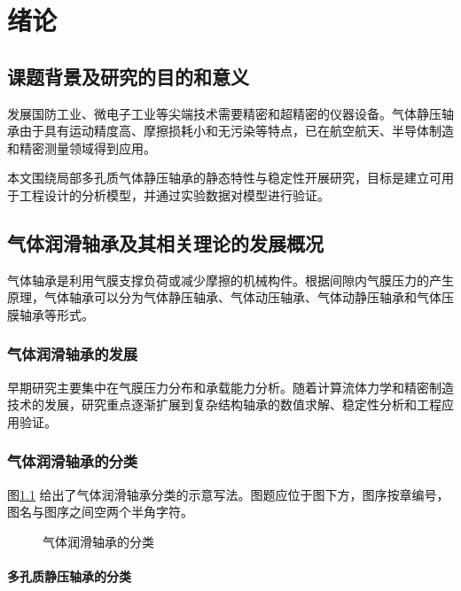 
\chapter{绪论}

\section{课题背景及研究的目的和意义}

发展国防工业、微电子工业等尖端技术需要精密和超精密的仪器设备。气体静压轴承由于具有运动精度高、摩擦损耗小和无污染等特点，已在航空航天、半导体制造和精密测量领域得到应用。

本文围绕局部多孔质气体静压轴承的静态特性与稳定性开展研究，目标是建立可用于工程设计的分析模型，并通过实验数据对模型进行验证。

\section{气体润滑轴承及其相关理论的发展概况}

气体轴承是利用气膜支撑负荷或减少摩擦的机械构件。根据间隙内气膜压力的产生原理，气体轴承可以分为气体静压轴承、气体动压轴承、气体动静压轴承和气体压膜轴承等形式。

\subsection{气体润滑轴承的发展}

早期研究主要集中在气膜压力分布和承载能力分析。随着计算流体力学和精密制造技术的发展，研究重点逐渐扩展到复杂结构轴承的数值求解、稳定性分析和工程应用验证\cite{hithesis2017,Chen1992}。

\subsection{气体润滑轴承的分类}

图\ref{fig:bearing-types} 给出了气体润滑轴承分类的示意写法。图题应位于图下方，图序按章编号，图名与图序之间空两个半角字符。

\begin{figure}[htbp]
  \centering
  \fbox{\rule{0pt}{32mm}\rule{105mm}{0pt}}
  \caption{气体润滑轴承的分类}
  \label{fig:bearing-types}
\end{figure}

\subsubsection{多孔质静压轴承的分类}

